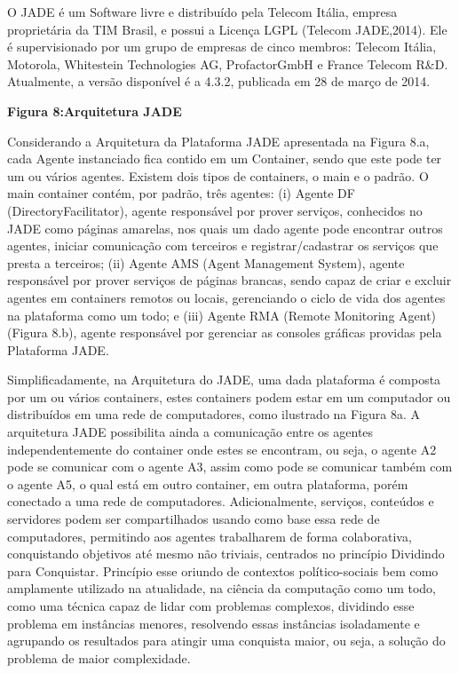 O JADE é um Software livre e distribuído pela Telecom Itália, empresa proprietária da TIM Brasil, e possui a Licença LGPL (Telecom JADE,2014). Ele é supervisionado por um grupo de empresas de cinco membros: Telecom Itália, Motorola, Whitestein Technologies AG, ProfactorGmbH e France Telecom R\&D. Atualmente, a versão disponível é a 4.3.2, publicada em 28 de março de 2014.

\textbf{Figura 8:Arquitetura JADE}

Considerando a Arquitetura da Plataforma JADE apresentada na Figura 8.a, cada Agente instanciado fica contido em um Container, sendo que este pode ter um ou vários agentes. Existem dois tipos de containers, o main e o padrão. O main container contém, por padrão, três agentes: (i) Agente DF (DirectoryFacilitator), agente responsável por prover serviços, conhecidos no JADE como páginas amarelas, nos quais um dado agente pode encontrar outros agentes, iniciar comunicação com terceiros e registrar/cadastrar os serviços que presta a terceiros; (ii) Agente AMS (Agent Management System), agente responsável por prover serviços de páginas brancas, sendo capaz de criar e excluir agentes em containers remotos ou locais, gerenciando o ciclo de vida dos agentes na plataforma como um todo; e (iii) Agente RMA (Remote Monitoring Agent) (Figura 8.b), agente responsável por gerenciar as consoles gráficas providas pela Plataforma JADE.

Simplificadamente, na Arquitetura do JADE, uma dada plataforma é composta por um ou vários containers, estes containers podem estar em um computador ou distribuídos em uma rede de computadores, como ilustrado na Figura 8a. A arquitetura JADE possibilita ainda a comunicação entre os agentes independentemente do container onde estes se encontram, ou seja, o agente A2 pode se comunicar com o agente A3, assim como pode se comunicar também com o agente A5, o qual está em outro container, em outra plataforma, porém conectado a uma rede de computadores. Adicionalmente, serviços, conteúdos e servidores podem ser compartilhados usando como base essa rede de computadores, permitindo aos agentes trabalharem de forma colaborativa, conquistando objetivos até mesmo não triviais, centrados no princípio Dividindo para Conquistar. Princípio esse oriundo de contextos político-sociais bem como amplamente utilizado na atualidade, na ciência da computação como um todo, como uma técnica capaz de lidar com problemas complexos, dividindo esse problema em instâncias menores, resolvendo essas instâncias isoladamente e agrupando os resultados para atingir uma conquista maior, ou seja, a solução do problema de maior complexidade.


